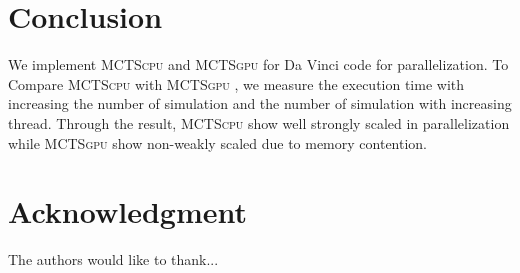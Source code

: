 \documentclass[conference]{IEEEtran}
\newcommand{\cpu} {\textsc{MCTScpu} }
\newcommand{\gpu} {\textsc{MCTSgpu} }
\begin{document}
\section{Conclusion}
We implement \cpu and \gpu for Da Vinci code for parallelization. 
To Compare \cpu with \gpu, we measure the execution time with increasing the number of simulation and the number of simulation with increasing thread. 
Through the result, \cpu show well strongly scaled in parallelization while \gpu show non-weakly scaled due to memory contention. 






\section*{Acknowledgment}


The authors would like to thank...







%
%
%







\end{document}
